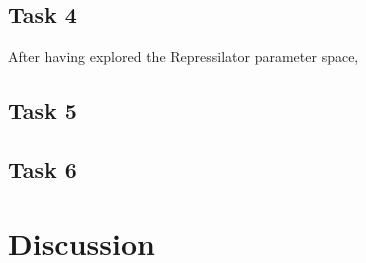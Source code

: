 \documentclass[runningheads,a4paper]{llncs}
\begin{document}
\clearpage
\subsection*{Task 4}
After having explored the Repressilator parameter space, 

\subsection*{Task 5}
\subsection*{Task 6}

\section*{Discussion}


%
\clearpage

\singlespacing
\twocolumn
\raggedright
\raggedbottom
{}
%
\small{}

%
\end{document}
